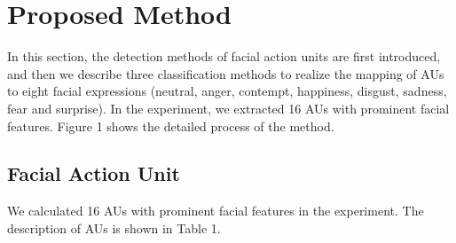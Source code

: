\documentclass[10pt, conference, compsocconf]{IEEEtran}
\begin{document}
\section{Proposed Method}
In this section, the detection methods of facial action units are first introduced, and then we describe three classification methods to realize the mapping of AUs to eight facial expressions (neutral, anger, contempt, happiness, disgust, sadness, fear and surprise). In the experiment, we extracted 16 AUs with prominent facial features. Figure 1 shows the detailed process of the method.

\subsection{Facial Action Unit}

We calculated 16 AUs with prominent facial features in the experiment. The description of AUs is shown in Table 1.
\end{document}
